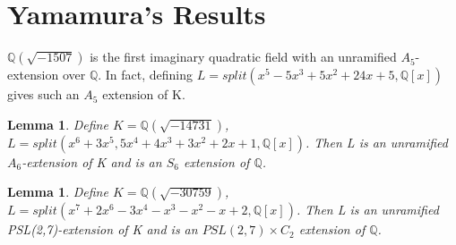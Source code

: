 \documentclass[preprint,12pt,reqno]{elsarticle}
\newtheorem{lemma}[theorem]{Lemma}
\begin{document}
\section{Yamamura's Results}
\cite{YAM2} $\mathbb{Q}(\sqrt{-1507})$ is the first imaginary quadratic field with an unramified $A_5$-extension over $\mathbb{Q}$. In fact, defining $L=split(x^5-5x^3+5x^2+24x+5,\mathbb{Q}[x])$ gives such an $A_5$ extension of K. 
\begin{lemma}
Define $K=\mathbb{Q}(\sqrt{-14731})$, $L=split(x^6+3x^5,5x^4+4x^3+3x^2+2x+1,\mathbb{Q}[x])$. Then L is an unramified $A_6$-extension of K and is an $S_6$ extension of $\mathbb{Q}$.
\end{lemma}
\begin{lemma}
Define $K=\mathbb{Q}(\sqrt{-30759})$, $L=split(x^7+2x^6-3x^4-x^3-x^2-x+2,\mathbb{Q}[x])$. Then L is an unramified PSL(2,7)-extension of K and is an $PSL(2,7)\times C_2$ extension of $\mathbb{Q}$.
\end{lemma}
\end{document}
